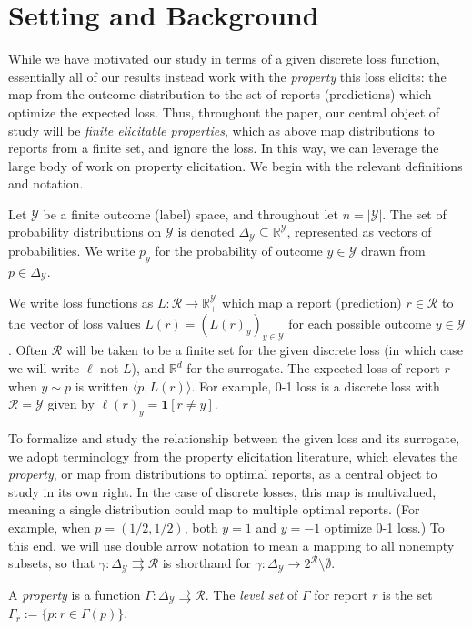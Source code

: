 \documentclass[anon,12pt]{colt2019}
\newcommand{\reals}{\mathbb{R}}
\newcommand{\simplex}{\Delta_\Y}
\newcommand{\R}{\mathcal{R}}
\newcommand{\Y}{\mathcal{Y}}
\newcommand{\inprod}[2]{\langle #1, #2 \rangle}%
\newcommand{\toto}{\rightrightarrows}
\newcommand{\Ind}{\mathbf{1}}
\begin{document}
\section{Setting and Background}

While we have motivated our study in terms of a given discrete loss function, essentially all of our results instead work with the \emph{property} this loss elicits: the map from the outcome distribution to the set of reports (predictions) which optimize the expected loss.
Thus, throughout the paper, our central object of study will be \emph{finite elicitable properties}, which as above map distributions to reports from a finite set, and ignore the loss.
In this way, we can leverage the large body of work on property elicitation.
We begin with the relevant definitions and notation.

Let $\Y$ be a finite outcome (label) space, and throughout let $n=|\Y|$.
The set of probability distributions on $\Y$ is denoted $\simplex\subseteq\reals^{\Y}$, represented as vectors of probabilities.
We write $p_y$ for the probability of outcome $y \in \Y$ drawn from $p \in \simplex$.

We write loss functions as $L:\R\to\reals^\Y_+$ which map a report (prediction) $r\in\R$ to the vector of loss values $L(r) = (L(r)_y)_{y\in\Y}$ for each possible outcome $y\in\Y$.
Often $\R$ will be taken to be a finite set for the given discrete loss (in which case we will write $\ell$ not $L$), and $\reals^d$ for the surrogate.
The expected loss of report $r$ when $y \sim p$ is written $\inprod{p}{L(r)}$.
For example, 0-1 loss is a discrete loss with $\R = \Y$ given by $\ell(r)_y = \Ind[r \neq y]$.

To formalize and study the relationship between the given loss and its surrogate, we adopt terminology from the property elicitation literature, which elevates the \emph{property}, or map from distributions to optimal reports, as a central object to study in its own right.
In the case of discrete losses, this map is multivalued, meaning a single distribution could map to multiple optimal reports.
(For example, when $p=(1/2,1/2)$, both $y=1$ and $y=-1$ optimize 0-1 loss.)
To this end, we will use double arrow notation to mean a mapping to all nonempty subsets, so that $\gamma: \simplex \toto \R$ is shorthand for $\gamma: \simplex \to 2^{\R} \setminus \emptyset$.

\begin{definition}\label{def:property}
  A \emph{property} is a function $\Gamma:\simplex\toto\R$.
  The \emph{level set} of $\Gamma$ for report $r$ is the set $\Gamma_r := \{p : r \in \Gamma(p)\}$.
\end{definition}
\end{document}
